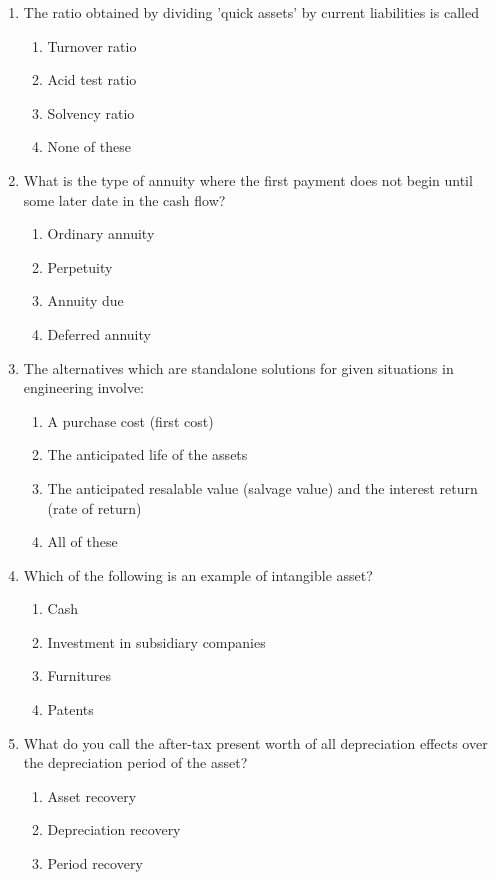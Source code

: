 \documentclass[11pt,a4paper]{article}
\begin{document}
\begin{enumerate}
\begin{enumerate*}[itemjoin=\qquad, label=\Alph*.]
\end{enumerate*}
\item{The ratio obtained by dividing 'quick assets' by current liabilities is called}
\begin{enumerate}[label=\Alph*.]
\item{Turnover ratio}
\item{Acid test ratio}
\item{Solvency ratio}
\item{None of these}
\end{enumerate}
\item{What is the type of annuity where the first payment does not begin until some later date in the cash flow?}
\begin{enumerate}[label=\Alph*.]
\item{Ordinary annuity}
\item{Perpetuity}
\item{Annuity due}
\item{Deferred annuity}
\end{enumerate}
\item{The alternatives which are standalone solutions for given situations in engineering involve:}
\begin{enumerate}[label=\Alph*.]
\item{A purchase cost (first cost)}
\item{The anticipated life of the assets}
\item{The anticipated resalable value (salvage value) and the interest return (rate of return)}
\item{All of these}
\end{enumerate}
\item{Which of the following is an example of intangible asset?}
\begin{enumerate}[label=\Alph*.]
\item{Cash}
\item{Investment in subsidiary companies}
\item{Furnitures}
\item{Patents}
\end{enumerate}
\item{What do you call the after-tax present worth of all depreciation effects over the depreciation period of the asset?}
\begin{enumerate}[label=\Alph*.]
\item{Asset recovery}
\item{Depreciation recovery}
\item{Period recovery}

\end{enumerate}
\end{enumerate}
\end{document}

